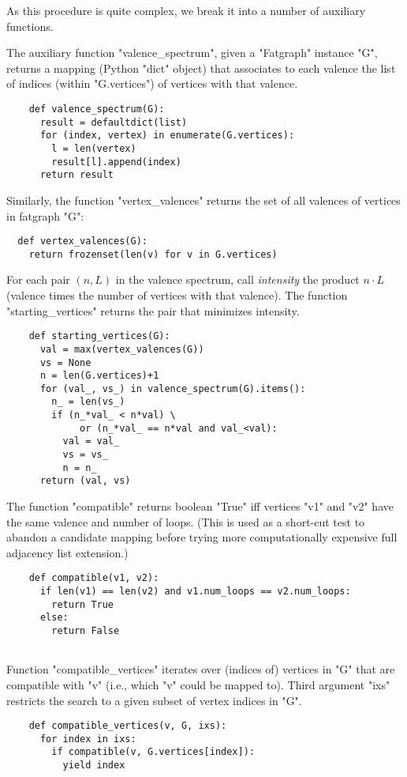 As this procedure is quite complex, we break it into a
number of auxiliary functions.

The auxiliary function "valence_spectrum", given a "Fatgraph" instance
"G", returns a mapping (Python "dict" object) that associates to each
valence the list of indices (within "G.vertices") of vertices with
that valence.
\begin{lstlisting}
    def valence_spectrum(G):
      result = defaultdict(list)
      for (index, vertex) in enumerate(G.vertices):
        l = len(vertex)
        result[l].append(index)
      return result

\end{lstlisting}

Similarly, the function "vertex_valences" returns the set of all
valences of vertices in fatgraph "G":
\begin{lstlisting}
  def vertex_valences(G):
    return frozenset(len(v) for v in G.vertices)
\end{lstlisting}

For each pair $(n, L)$ in the valence spectrum, call \emph{intensity}
the product $n \cdot L$ (valence times the number of vertices with
that valence).  The function "starting_vertices" returns the pair that
minimizes intensity.
\begin{lstlisting}
    def starting_vertices(G):
      val = max(vertex_valences(G))
      vs = None
      n = len(G.vertices)+1
      for (val_, vs_) in valence_spectrum(G).items():
        n_ = len(vs_)
        if (n_*val_ < n*val) \
             or (n_*val_ == n*val and val_<val):
          val = val_
          vs = vs_
          n = n_
      return (val, vs)

\end{lstlisting}

The function "compatible" returns boolean "True" iff vertices "v1" and
"v2" have the same valence and number of loops.  (This is used as a
short-cut test to abandon a candidate mapping before trying more
computationally expensive full adjacency list extension.)
\begin{lstlisting}
    def compatible(v1, v2):
      if len(v1) == len(v2) and v1.num_loops == v2.num_loops:
        return True
      else:
        return False
        
\end{lstlisting}
Function "compatible_vertices" iterates over (indices of)
vertices in "G" that are compatible with "v" (i.e., which "v" could be
mapped to). Third argument "ixs" restricts the search to a given
subset of vertex indices in "G".
\begin{lstlisting}
    def compatible_vertices(v, G, ixs):
      for index in ixs:
        if compatible(v, G.vertices[index]):
          yield index

\end{lstlisting}

